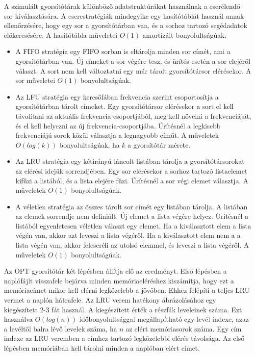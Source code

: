 \documentclass[12pt]{report}
\begin{document}
A szimulált gyorsítótárak különböző adatstruktúrákat használnak
a cserélendő sor kiválasztására.
A cserestratégiák mindegyike egy hasítótáblát használ
annak ellenőrzésére, hogy egy sor a gyorsítótárban van,
és a sorhoz tartozó segédadatok előkeresésére.
A hasítótábla műveletei $O(1)$ amortizált bonyolultságúak.
\begin{itemize}
\item A FIFO stratégia egy FIFO sorban is eltárolja minden
sor címét, ami a gyorsítótárban van.
Új címeket a sor végére tesz, és ürítés esetén a sor elejéről választ.
A sort nem kell változtatni egy már tárolt gyorsítótársor elérésekor.
A sor műveletei $O(1)$ bonyolultságúak.

\item Az LFU stratégia egy keresőfában frekvencia szerint csoportosítja
a gyorsítótárban tárolt címeket.
Egy gyorsítótársor elérésekor a sort el kell távolítani
az aktuális frekvencia-csoportjából, meg kell növelni a frekvenciáját,
és el kell helyezni az új frekvencia-csoportjába.
Ürítésnél a legkisebb frekvenciájú sorok közül
választja a legnagyobb címűt.
A műveletek $O(log(k))$ bonyolultságúak, ha $k$ a gyorsítótár mérete.

\item Az LRU stratégia egy kétirányú láncolt listában tárolja
a gyorsítótársorokat az elérési idejük sorrendjében.
Egy sor elérésekor a sorhoz tartozó listaelemet kifűzi a listából,
és a lista elejére fűzi.
Ürítésnél a sor végi elemet választja.
A műveletek $O(1)$ bonyolultságúak.

\item A véletlen stratégia az összes tárolt sor címét
egy listában tárolja.
A listában az elemek sorrendje nem definiált.
Új elemet a lista végére helyez.
Ürítésnél a listából egyenletesen véletlen választ egy elemet.
Ha a kiválasztott elem a lista végén van, akkor azt leveszi a lista végéről.
Ha a kiválasztott elem nem a a lista végén van, akkor felcseréli
az utolsó elemmel, és leveszi a lista végéről.
A műveletek $O(1)$ bonyolultságúak.
\end{itemize}

Az OPT gyorsítótár két lépésben állítja elő az eredményt.\cite{stack-algorithm}
Első lépésben a naplófájlt visszafele bejárva minden memóriaeléréshez
kiszámítja, hogy ezt a memóriacímet mikor kell elérni legközelebb a jövőben.
Ehhez felépíti a teljes LRU vermet a naplón hátrafele.
Az LRU verem hatékony ábrázolásához egy kiegészített 2-3 fát használ.
A kiegészített érték a részfák leveleinek száma.
Ezt használva $O(log(n))$ időbonyolultsággal megállapítható
egy levél indexe, azaz a levéltől balra lévő levelek száma,
ha $n$ az elért memóriasorok száma.
Egy cím indexe az LRU veremben a címhez tartozó legközelebbi elérés távolsága.
Az első lépésben memóriában kell tárolni minden a naplóban elért címet.
\end{document}
